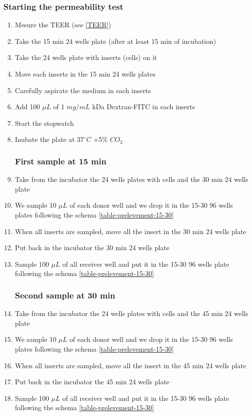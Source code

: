 \subsubsection{Starting the permeability test}
\begin{enumerate}
\item Mesure the TEER (see \ref{TEER})
\item Take the 15 min 24 wells plate (after at least 15 min of incubation)
\item Take the 24 wells plate with inserts (cells) on it
\item Move each inserts in the 15 min 24 wells plates
\item Carefully aspirate the medium in each inserts
\item Add 100 $\mu L$ of 1 $mg/mL$  kDa Dextran-FITC in each inserts
\item Start the stopwatch  
\item Inubate the plate at $37^\circ C$ +5\% $CO_2$
\subsubsection{First sample at \textbf{15 min}}
\item Take from the incubator the 24 wells plates with cells and the 30 min 24 wells plate
\item We sample 10 $\mu L$ of each donor well and we drop it in the 15-30 96 wells plates following the schema \ref{table-prelevement-15-30}
\item When all inserts are sampled, move all the insert in the 30 min 24 wells plate
\item Put back in the incubator the 30 min 24 wells plate
\item Sample 100 $\mu L$ of all receiver well and put it in the 15-30 96 wells plate following the schema \ref{table-prelevement-15-30}
\subsubsection{Second sample at \textbf{30 min}}
\item Take from the incubator the 24 wells plates with cells and the 45 min 24 wells plate
\item We sample 10 $\mu L$ of each donor well and we drop it in the 15-30 96 wells plates following the schema \ref{table-prelevement-15-30}
\item When all inserts are sampled, move all the insert in the 45 min 24 wells plate
\item Put back in the incubator the 45 min 24 wells plate
\item Sample 100 $\mu L$ of all receiver well and put it in the 15-30 96 wells plate following the schema \ref{table-prelevement-15-30}

\end{enumerate}
